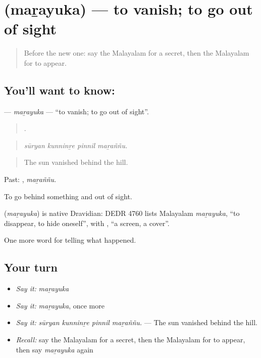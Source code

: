 \section[\texorpdfstring{\ml{മറയുക} (maṟayuka)}{മറയുക (maṟayuka)}]{ (maṟayuka) — to vanish; to go out of sight}

\label{lesson:ML-C383-marayuka}



\begin{quote}
Before the new one: say the Malayalam for a secret, then the Malayalam for to appear.
\end{quote}

\subsection*{You'll want to know: }
\textbf{} — \emph{maṟayuka} — \textquotedblleft{}to vanish; to go out of sight\textquotedblright{}.

\begin{quote}
   .
\end{quote}

\begin{quote}
\emph{sūryan kunninṟe pinnil maṟaññu.}
\end{quote}

\begin{quote}
The sun vanished behind the hill.
\end{quote}

Past: , \emph{maṟaññu}.

To go behind something and out of sight.

\begin{cousinweb}
\textbf{} (\emph{maṟayuka}) is native Dravidian: DEDR 4760 lists Malayalam \emph{maṟayuka}, \textquotedblleft{}to disappear, to hide oneself\textquotedblright{}, with , \textquotedblleft{}a screen, a cover\textquotedblright{}.
\end{cousinweb}

\begin{grammarlens}[title={What you've built}]
One more word for telling what happened.
\end{grammarlens}

\subsection*{Your turn}
\begin{itemize}
\raggedright
  \item \emph{Say it:} \emph{maṟayuka}
  \item \emph{Say it:} \emph{maṟayuka}, once more
  \item \emph{Say it:} \emph{sūryan kunninṟe pinnil maṟaññu.} — The sun vanished behind the hill.
  \item \emph{Recall:} say the Malayalam for a secret, then the Malayalam for to appear, then say \emph{maṟayuka} again
\end{itemize}

